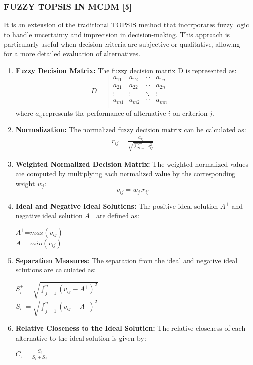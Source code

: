 \documentclass[12pt,a4paper]{article}
\begin{document}
\subsubsection*{FUZZY TOPSIS IN MCDM [5]}
\hspace{1em}It is an extension of the traditional TOPSIS method that incorporates fuzzy logic to handle uncertainty and imprecision in decision-making. This approach is particularly useful when decision criteria are subjective or qualitative, allowing for a more detailed evaluation of alternatives.

\begin{enumerate}
    \item \textbf{Fuzzy Decision Matrix:} The fuzzy decision matrix D is represented as:
    \[
D=
\begin{bmatrix}
a_{11} & a_{12} &\cdots & a_{1n}\\
a_{21} & a_{22} &\cdots & a_{2n}\\
\vdots & \vdots & \ddots & \vdots\\
a_{m1} & a_{m2} &\cdots & a_{mn}\\
\end{bmatrix}
\]
where $a_{ij}$represents the performance of alternative $i$ on criterion $j$.\\

\item \textbf{Normalization:} The normalized fuzzy decision matrix can be calculated as:
\begin{eqnarray*}
    r_{ij}=\frac{a_{ij}}{\sqrt{\sum\limits^{m}_{i=1}a^{2}_{ij}}}
\end{eqnarray*}
\item \textbf{Weighted Normalized Decision Matrix:} The weighted normalized values are computed by multiplying each normalized value by the corresponding weight $w_{j}$:
\begin{equation*}
    v_{ij}=w_{j}.r_{ij}
\end{equation*}
\item \textbf{Ideal and Negative Ideal Solutions:} The positive ideal solution $A^{+}$ and negative ideal solution $A^{-}$ are defined as:
\begin{center}
    $A^{+}$={$max(v_{ij})$}\\
    $A^{-}$={$min(v_{ij})$}
\end{center}
\item \textbf{Separation Measures:} The separation from the ideal and negative ideal solutions are calculated as:
\begin{center}
   $S_{i}^{+}=\sqrt{\int^{n}_{j=1}(v_{ij}-A^{+})^{2}}$\\
   $S_{i}^{-}=\sqrt{\int^{n}_{j=1}(v_{ij}-A^{-})^{2}}$   
\end{center}
\item \textbf{Relative Closeness to the Ideal Solution:} The relative closeness of each alternative to the ideal solution is given by:
\begin{center}
 $C_{i}=\frac{S_{i}}{S_{i}+S_{j}}$   
\end{center}
    
\end{enumerate}
\end{document}
